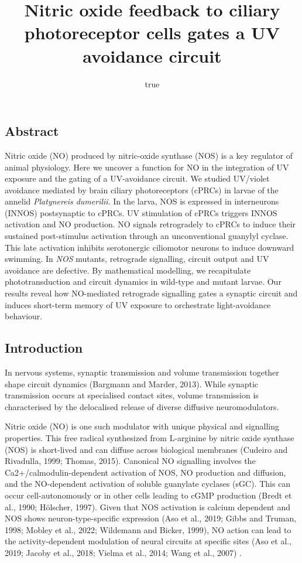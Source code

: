 \documentclass[
  10pt,
  onecolumn]{article}
\title{Nitric oxide feedback to ciliary photoreceptor cells gates a UV
avoidance circuit}
\author{true}
\date{}
\begin{document}
\maketitle

\hypertarget{abstract}{%
\subsection{Abstract}\label{abstract}}

Nitric oxide (NO) produced by nitric-oxide synthase (NOS) is a key
regulator of animal physiology. Here we uncover a function for NO in the
integration of UV exposure and the gating of a UV-avoidance circuit. We
studied UV/violet avoidance mediated by brain ciliary photoreceptors
(cPRCs) in larvae of the annelid \emph{Platynereis dumerilii}. In the
larva, NOS is expressed in interneurons (INNOS) postsynaptic to cPRCs.
UV stimulation of cPRCs triggers INNOS activation and NO production. NO
signals retrogradely to cPRCs to induce their sustained post-stimulus
activation through an unconventional guanylyl cyclase. This late
activation inhibits serotonergic ciliomotor neurons to induce downward
swimming. In \emph{NOS} mutants, retrograde signalling, circuit output
and UV avoidance are defective. By mathematical modelling, we
recapitulate phototransduction and circuit dynamics in wild-type and
mutant larvae. Our results reveal how NO-mediated retrograde signalling
gates a synaptic circuit and induces short-term memory of UV exposure to
orchestrate light-avoidance behaviour.

\hypertarget{introduction}{%
\subsection{Introduction}\label{introduction}}

In nervous systems, synaptic transmission and volume transmission
together shape circuit dynamics (Bargmann and Marder, 2013). While
synaptic transmission occurs at specialised contact sites, volume
transmission is characterised by the delocalised release of diverse
diffusive neuromodulators.

Nitric oxide (NO) is one such modulator with unique physical and
signalling properties. This free radical synthesized from L-arginine by
nitric oxide synthase (NOS) is short-lived and can diffuse across
biological membranes (Cudeiro and Rivadulla, 1999; Thomas, 2015).
Canonical NO signalling involves the Ca2+/calmodulin-dependent
activation of NOS, NO production and diffusion, and the NO-dependent
activation of soluble guanylate cyclases (sGC). This can occur
cell-autonomously or in other cells leading to cGMP production (Bredt et
al., 1990; Hölscher, 1997). Given that NOS activation is calcium
dependent and NOS shows neuron-type-specific expression (Aso et al.,
2019; Gibbs and Truman, 1998; Mobley et al., 2022; Wildemann and Bicker,
1999), NO action can lead to the activity-dependent modulation of neural
circuits at specific sites (Aso et al., 2019; Jacoby et al., 2018;
Vielma et al., 2014; Wang et al., 2007) .
\end{document}
